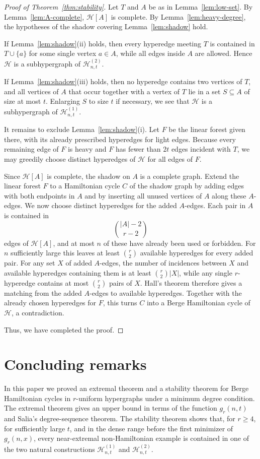 \documentclass[12pt]{article}
\newcommand{\Hcal}{\mathcal H}
\begin{document}
\begin{proof}[Proof of Theorem~\ref{thm:stability}]
Let $T$ and $A$ be as in Lemma~\ref{lem:low-set}.  By
Lemma~\ref{lem:A-complete}, $\Hcal[A]$ is complete.  By
Lemma~\ref{lem:heavy-degree}, the hypotheses of the shadow covering Lemma~\ref{lem:shadow}
hold.

If Lemma~\ref{lem:shadow}(ii) holds, then every hyperedge meeting $T$ is
contained in $T\cup\{a\}$ for some single vertex $a\in A$, while all
edges inside $A$ are allowed.  Hence $\Hcal$ is a subhypergraph of
$\Hcal^{(2)}_{n,t}$.

If Lemma~\ref{lem:shadow}(iii) holds, then no hyperedge contains two
vertices of $T$, and all vertices of $A$ that occur together with a vertex
of $T$ lie in a set $S\subseteq A$ of size at most $t$.  Enlarging $S$ to
size $t$ if necessary, we see that $\Hcal$ is a subhypergraph of
$\Hcal^{(1)}_{n,t}$.

It remains to exclude Lemma~\ref{lem:shadow}(i).  Let $F$ be the linear
forest given there, with its already prescribed hyperedges for light
edges.  Because every remaining edge of $F$ is heavy and $F$ has fewer
than $2t$ edges incident with $T$, we may greedily choose distinct
hyperedges of $\Hcal$ for all edges of $F$.

Since $\Hcal[A]$ is complete, the shadow on $A$ is a complete graph.
Extend the linear forest $F$ to a Hamiltonian cycle $C$ of the shadow graph
by adding edges with both endpoints in $A$ and by inserting all unused
vertices of $A$ along these $A$-edges.  We now choose distinct hyperedges
for the added $A$-edges.  Each pair in $A$ is contained in
$$
        \binom{|A|-2}{r-2}
$$
edges of $\Hcal[A]$, and at most $n$ of these have already been used or
forbidden.  For $n$ sufficiently large this leaves at least $\binom r2$
available hyperedges for every added pair.  For any set $X$ of added
$A$-edges, the number of incidences between $X$ and available hyperedges
containing them is at least $\binom r2 |X|$, while any single
$r$-hyperedge contains at most $\binom r2$ pairs of $X$.  Hall's theorem
therefore gives a matching from the added $A$-edges to available
hyperedges.  Together with the already chosen hyperedges for $F$, this
turns $C$ into a Berge Hamiltonian cycle of $\Hcal$, a contradiction.

Thus, we have completed the proof. 
\end{proof}
\section{Concluding remarks}\label{sec:concluding}
In this paper we proved an extremal theorem and a stability theorem for
Berge Hamiltonian cycles in $r$-uniform hypergraphs under a minimum degree
condition. The extremal theorem gives an upper bound in terms of the function
$g_r(n,t)$ and Salia's degree-sequence theorem. The stability theorem shows
that, for $r \ge 4$, for sufficiently large $t$, and in the dense range before
the first minimizer of $g_r(n,x)$, every near-extremal non-Hamiltonian example
is contained in one of the two natural constructions $\mathcal{H}^{(1)}_{n,t}$ and
$\mathcal{H}^{(2)}_{n,t}$.
\end{document}
